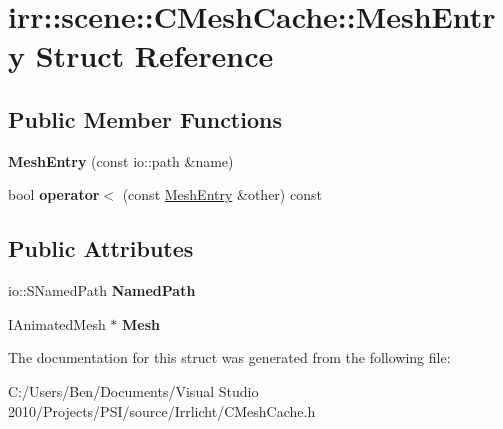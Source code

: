 \hypertarget{structirr_1_1scene_1_1_c_mesh_cache_1_1_mesh_entry}{\section{irr\-:\-:scene\-:\-:C\-Mesh\-Cache\-:\-:Mesh\-Entry Struct Reference}
\label{structirr_1_1scene_1_1_c_mesh_cache_1_1_mesh_entry}
}
\subsection*{Public Member Functions}
\begin{DoxyCompactItemize}
\item 
\hypertarget{structirr_1_1scene_1_1_c_mesh_cache_1_1_mesh_entry_a7dbe464a68512513766ce64931b9ae5d}{{\bfseries Mesh\-Entry} (const io\-::path \&name)}\label{structirr_1_1scene_1_1_c_mesh_cache_1_1_mesh_entry_a7dbe464a68512513766ce64931b9ae5d}

\item 
\hypertarget{structirr_1_1scene_1_1_c_mesh_cache_1_1_mesh_entry_ace457da4af6aa5207323dd40d48fd084}{bool {\bfseries operator$<$} (const \hyperlink{structirr_1_1scene_1_1_c_mesh_cache_1_1_mesh_entry}{Mesh\-Entry} \&other) const }\label{structirr_1_1scene_1_1_c_mesh_cache_1_1_mesh_entry_ace457da4af6aa5207323dd40d48fd084}

\end{DoxyCompactItemize}
\subsection*{Public Attributes}
\begin{DoxyCompactItemize}
\item 
\hypertarget{structirr_1_1scene_1_1_c_mesh_cache_1_1_mesh_entry_ae6f7fc1c94f396dd2868517b2127b3e6}{io\-::\-S\-Named\-Path {\bfseries Named\-Path}}\label{structirr_1_1scene_1_1_c_mesh_cache_1_1_mesh_entry_ae6f7fc1c94f396dd2868517b2127b3e6}

\item 
\hypertarget{structirr_1_1scene_1_1_c_mesh_cache_1_1_mesh_entry_a966c74c63b91de4b21efc56dc9c981d6}{I\-Animated\-Mesh $\ast$ {\bfseries Mesh}}\label{structirr_1_1scene_1_1_c_mesh_cache_1_1_mesh_entry_a966c74c63b91de4b21efc56dc9c981d6}

\end{DoxyCompactItemize}


The documentation for this struct was generated from the following file\-:\begin{DoxyCompactItemize}
\item 
C\-:/\-Users/\-Ben/\-Documents/\-Visual Studio 2010/\-Projects/\-P\-S\-I/source/\-Irrlicht/C\-Mesh\-Cache.\-h\end{DoxyCompactItemize}
